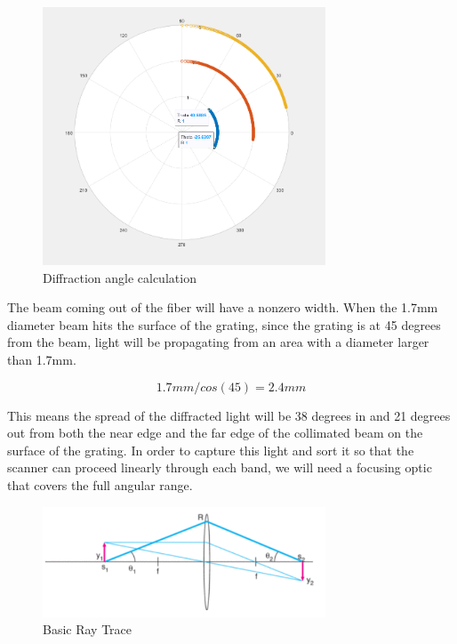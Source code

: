 \begin{figure}[H]
    \caption{Diffraction angle calculation}
    \centering
    \includegraphics[width=0.75\textwidth]{images/DiffractionAngleCalculator.png}
\end{figure}

The beam coming out of the fiber will have a nonzero width. When the 1.7mm diameter beam hits the surface of the grating, since the grating is at 45 degrees from the beam, light will be propagating from an area with a diameter larger than 1.7mm.

\begin{equation}
    1.7mm/cos(45) = 2.4mm
\end{equation}

This means the spread of the diffracted light will be 38 degrees in and 21 degrees out from both the near edge and the far edge of the collimated beam on the surface of the grating. In order to capture this light and sort it so that the scanner can proceed linearly through each band, we will need a focusing optic that covers the full angular range.

\begin{figure}[H]
    \caption{Basic Ray Trace}
    \centering
    \includegraphics[width=0.75\textwidth]{images/BasicRayTrace.png}
\end{figure}

